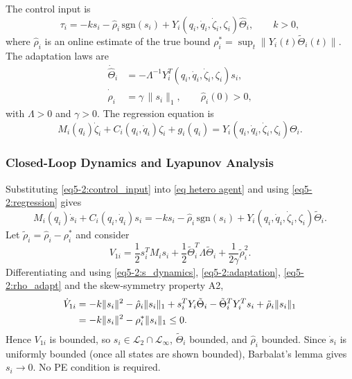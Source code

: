The control input is
\begin{equation}\label{eq5-2:control_input}
	\tau_i = -k s_i - \hat{\rho}_i\,\mathrm{sgn}(s_i)
	+ Y_i(q_i,\dot{q}_i,\dot{\zeta}_i,\zeta_i) \hat{\Theta}_i,\qquad k>0,
\end{equation}
where $\hat{\rho}_i$ is an online estimate of the true bound
$\rho_i^* = \sup_t\|Y_i(t)\tilde{\Theta}_i(t)\|$. The adaptation laws are
\begin{align}
	\dot{\hat{\Theta}}_i &= -\Lambda^{-1} Y_i^T(q_i,\dot{q}_i,\dot{\zeta}_i,\zeta_i) s_i,
	\label{eq5-2:adaptation}\\
	\dot{\hat{\rho}}_i &= \gamma\,\|s_i\|_1,\qquad \hat{\rho}_i(0) > 0,
	\label{eq5-2:rho_adapt}
\end{align}
with $\Lambda > 0$ and $\gamma > 0$. The regression equation is
\begin{equation}\label{eq5-2:regression}
	M_i(q_i)\dot{\zeta}_i + C_i(q_i,\dot{q}_i)\zeta_i + g_i(q_i)
	= Y_i(q_i,\dot{q}_i,\dot{\zeta}_i,\zeta_i)\Theta_i.
\end{equation}

\subsubsection{Closed-Loop Dynamics and Lyapunov Analysis}

Substituting \eqref{eq5-2:control_input} into \eqref{eq hetero agent} and using
\eqref{eq5-2:regression} gives
\begin{equation}\label{eq5-2:s_dynamics}
	M_i(q_i)\dot{s}_i + C_i(q_i,\dot{q}_i)s_i
	= -k s_i - \hat{\rho}_i\,\mathrm{sgn}(s_i)
	+ Y_i(q_i,\dot{q}_i,\dot{\zeta}_i,\zeta_i)\tilde{\Theta}_i.
\end{equation}
Let $\tilde{\rho}_i = \hat{\rho}_i - \rho_i^*$ and consider
\begin{equation}\label{eq5-2:V}
	V_{1i} = \frac12 s_i^T M_i s_i
	+ \frac12 \tilde{\Theta}_i^T \Lambda \tilde{\Theta}_i
	+ \frac{1}{2\gamma}\tilde{\rho}_i^2.
\end{equation}
Differentiating and using \eqref{eq5-2:s_dynamics}, \eqref{eq5-2:adaptation},
\eqref{eq5-2:rho_adapt} and the skew-symmetry property A2,
\begin{align}
	\dot{V}_{1i}
	&= -k\|s_i\|^2 - \hat{\rho}_i\|s_i\|_1
		+ s_i^T Y_i\tilde{\Theta}_i
		- \tilde{\Theta}_i^T Y_i^T s_i
		+ \tilde{\rho}_i\|s_i\|_1 \notag\\
	&= -k\|s_i\|^2 - \rho_i^*\|s_i\|_1 \le 0. \label{eq5-2:V_dot}
\end{align}
Hence $V_{1i}$ is bounded, so $s_i \in \mathcal{L}_2 \cap \mathcal{L}_\infty$,
$\tilde{\Theta}_i$ bounded, and $\hat{\rho}_i$ bounded. Since $\dot{s}_i$ is uniformly
bounded (once all states are shown bounded), Barbalat's lemma gives $s_i \to 0$. No PE
condition is required.

